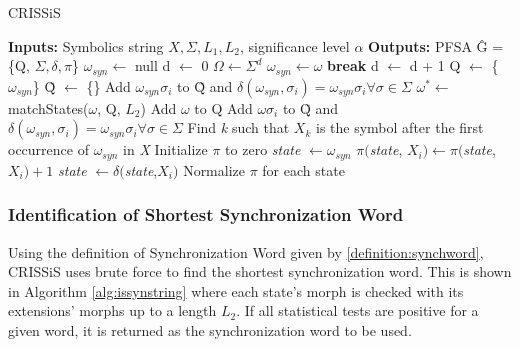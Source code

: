 {\begin{algorithm} 
  \caption{CRISSiS\label{alg:crissis}}
    \begin{algorithmic}[1]
      \State \textbf{Inputs:} Symbolics string $X, \Sigma, L_1, L_2$, significance level $\alpha$
      \State \textbf{Outputs:} PFSA \^{G} = \{Q, $\Sigma, \delta, \pi$\}
      \State $\omega_{syn} \leftarrow $ null
      \State d $\leftarrow $ 0
      	\State $\Omega \leftarrow \Sigma^d$
      	\ForAll{$\omega \in \Omega$}
      			\State $\omega_{syn}\leftarrow\omega$
      			\State \textbf{break}
      		\EndIf
      	\EndFor
      	\State d $\leftarrow$ d + 1
      \EndWhile
      \State Q $\leftarrow$ \{$\omega_{syn}$\}
      \State \~{Q} $\leftarrow$ \{\}
      \State Add $\omega_{syn}\sigma_i$ to \~{Q} and $\delta(\omega_{syn},\sigma_i) = \omega_{syn}\sigma_i  \forall \sigma\in\Sigma$
      		\State $\omega^* \leftarrow$ matchStates($\omega$, Q, $L_2$)
      			\State Add $\omega$ to Q
      			\State Add $\omega\sigma_i$ to \~{Q} and $\delta(\omega_{syn},\sigma_i) = \omega_{syn}\sigma_i  \forall \sigma\in\Sigma$
      		\Else
      		\EndIf
      	\EndIf
      \EndFor
      \State Find \textit{k} such that $X_k$ is the symbol after the first occurrence of $\omega_{syn}$ in \textit{X}
      \State Initialize $\pi$ to zero
      \State \textit{state} $\leftarrow \omega_{syn}$
		\State $\pi($\textit{state}, $X_i) \leftarrow \pi($\textit{state},$X_i) + 1$
		\State \textit{state} $\leftarrow \delta($\textit{state},$X_i)$      
      \EndFor 
      \State Normalize $\pi$ for each state
    \end{algorithmic}
  \end{algorithm}
  
\subsubsection{Identification of Shortest Synchronization Word}

Using the definition of Synchronization Word given by \ref{definition:synchword}, CRISSiS uses brute force to find the shortest synchronization word. This is shown in Algorithm \ref{alg:issynstring} where each state's morph is checked with its extensions' morphs up to a length $L_2$. If all statistical tests are positive for a given word, it is returned as the synchronization word to be used.
  
}
